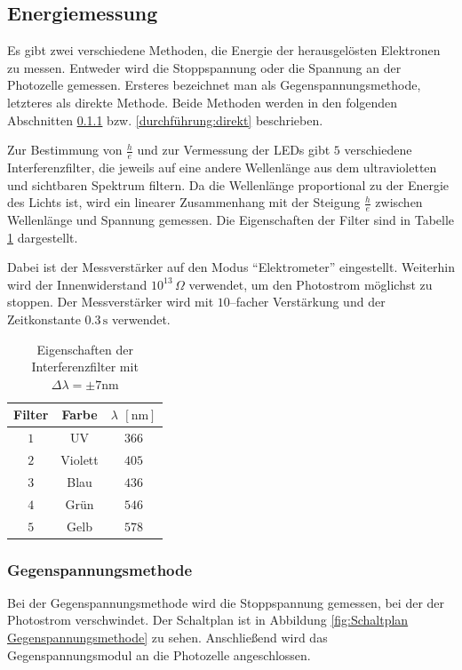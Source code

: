 \documentclass[12pt,a4paper]{scrartcl}
\numberwithin{equation}{section} %
\begin{document}
\subsection{Energiemessung}
\label{durchführung:Energiemessung}
Es gibt zwei verschiedene Methoden, die Energie der herausgelösten Elektronen zu messen. Entweder wird die Stoppspannung oder die Spannung an der Photozelle gemessen. Ersteres bezeichnet man als Gegenspannungsmethode, letzteres als direkte Methode. Beide Methoden werden in den folgenden Abschnitten \ref{durchführung:Gegenspannung} bzw. \ref{durchführung:direkt} beschrieben.

Zur Bestimmung von $\frac{h}{e}$ und zur Vermessung der LEDs gibt $5$ verschiedene Interferenzfilter, die jeweils auf eine andere Wellenlänge aus dem ultravioletten und sichtbaren Spektrum filtern. Da die Wellenlänge proportional zu der Energie des Lichts ist, wird ein linearer Zusammenhang mit der Steigung $\frac{h}{e}$ zwischen Wellenlänge und Spannung gemessen. Die Eigenschaften der Filter sind in Tabelle \ref{tab:Interferenzfilter} dargestellt.

Dabei ist der Messverstärker auf den Modus ``Elektrometer'' eingestellt. Weiterhin wird der Innenwiderstand $10^{13}\,\Omega$ verwendet, um den Photostrom möglichst zu stoppen. Der Messverstärker wird mit $10$--facher Verstärkung und der Zeitkonstante $0.3\mathrm{\,s}$  verwendet.

\begin{table}[h!]
	\centering
	\begin{tabular}{c|c|c}
		Filter & Farbe & $\lambda$ $[\mathrm{nm}]$ \\
		\hline
		$1$ & UV & $366$ \\
		$2$ & Violett & $405$ \\
		$3$ & Blau & $436$ \\
		$4$ & Grün & $546$ \\
		$5$ & Gelb & $578$ \\
	\end{tabular}
	\caption{Eigenschaften der Interferenzfilter mit $\Delta \lambda = \pm 7\mathrm{nm}$}
	\label{tab:Interferenzfilter}
\end{table}

\subsubsection{Gegenspannungsmethode}
\label{durchführung:Gegenspannung}

Bei der Gegenspannungsmethode wird die Stoppspannung gemessen, bei der der Photostrom verschwindet.  Der Schaltplan ist in Abbildung \ref{fig:Schaltplan Gegenspannungsmethode} zu sehen. Anschließend wird das Gegenspannungsmodul an die Photozelle angeschlossen.
\end{document}
